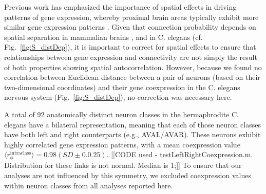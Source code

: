 \documentclass[10pt,letterpaper]{article}
\begin{document}
Previous work has emphasized the importance of spatial effects in driving patterns of gene expression, whereby proximal brain areas typically exhibit more similar gene expression patterns \citep{Pantazatos:2016ir, Krienen2016, Fulcher:2016ck}.
Given that connection probability depends on spatial separation in mammalian brains \cite{Henderson:2014fg, Horvat:2016ia, Wang:2016gg}, and in C. elegans (cf. Fig.~\ref{fig:S_distDep}), it is important to correct for spatial effects to ensure that relationships between gene expression and connectivity are not simply the result of both properties showing spatial autocorrelation.
However, because we found no correlation between Euclidean distance between a pair of neurons (based on their two-dimensional coordinates) and their gene coexpression in the C. elegans nervous system (Fig.~\ref{fig:S_distDep}), no correction was necessary here.

A total of 92 anatomically distinct neuron classes in the hermaphrodite C. elegans have a bilateral representation, meaning that each of those neuron classes have both left and right counterparts (e.g., AVAL/AVAR).
These neurons exhibit highly correlated gene expression patterns, with a mean coexpression value $\langle r_\phi^{\mathrm{intraclass}} \rangle = 0.98 (SD\pm0.0.25)$.
[[CODE used - testLeftRightCoexpression.m. Distribution for these links is not normal. Median is 1;]]
To ensure that our analyses are not influenced by this symmetry, we excluded coexpression values within neuron classes from all analyses reported here.

\end{document}
